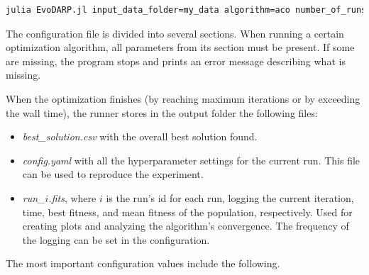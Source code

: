 \begin{lstlisting}[language=bash, breaklines=true]
    julia EvoDARP.jl input_data_folder=my_data algorithm=aco number_of_runs=10 num_ants=10 num_iterations=10000
\end{lstlisting}

The configuration file is divided into several sections. When running a certain optimization algorithm, all parameters from its section must be present. If some are missing, the program stops and prints an error message describing what is missing.

When the optimization finishes (by reaching maximum iterations or by exceeding the wall time), the runner stores in the output folder the following files:

\begin{itemize}
    \setlength\itemsep{0pt}
    \item \textit{best\_solution.csv} with the overall best solution found.
    \item \textit{config.yaml} with all the hyperparameter settings for the current run. This file can be used to reproduce the experiment.
    \item \textit{run\_$i$.fits}, where $i$ is the run's id for each run, logging the current iteration, time, best fitness, and mean fitness of the population, respectively. Used for creating plots and analyzing the algorithm's convergence. The frequency of the logging can be set in the configuration.
\end{itemize}

The most important configuration values include the following.

